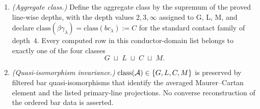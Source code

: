 \begin{theorem}
\begin{enumerate}[label=\textup{(\roman*)}]
\[\]
Hence $r_{\max}(\beta\gamma_\lambda) = 4$ and
$d_{\mathrm{alg}}(\beta\gamma_\lambda) = 2$. The internal
weight-changing line has zero shadow tower, while the T-line is
class~M; neither one-dimensional slice is the class-C witness by
itself.
\item\label{quad:iv} \emph{(Aggregate class.)} Define the aggregate
class by the supremum of the proved line-wise depths, with the depth
values $2,3,\infty$ assigned to G, L, M, and declare
$\mathrm{class}(\beta\gamma_\lambda) =
\mathrm{class}(bc_\lambda) := C$ for the standard contact family of
depth~$4$. Every computed row in this conductor-domain list belongs to
exactly one of the four classes
\[
G \;\sqcup\; L \;\sqcup\; C \;\sqcup\; M.
\]
\item\label{quad:v} \emph{(Quasi-isomorphism invariance.)}
$\mathrm{class}(\mathcal{A}) \in \{G, L, C, M\}$ is preserved by filtered bar
quasi-isomorphisms that identify the averaged Maurer--Cartan element
and the listed primary-line projections. No converse reconstruction of
the ordered bar data is asserted.
\end{enumerate}
\end{theorem}

